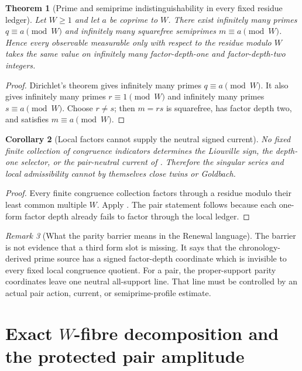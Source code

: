 \documentclass[11pt]{article}
\newtheorem{theorem}{Theorem}[section]
\newtheorem{corollary}[theorem]{Corollary}
\theoremstyle{definition}
\theoremstyle{remark}
\newtheorem{remark}[theorem]{Remark}
\begin{document}
\begin{theorem}[Prime and semiprime indistinguishability in every fixed residue ledger]
\label{thm:residue-parity-no-go}
Let $W\ge1$ and let $a$ be coprime to $W$.  There exist infinitely many primes
$q\equiv a\pmod W$ and infinitely many squarefree semiprimes
$m\equiv a\pmod W$.  Hence every observable measurable only with respect to
the residue modulo $W$ takes the same value on infinitely many factor-depth-one
and factor-depth-two integers.
\end{theorem}

\begin{proof}
Dirichlet's theorem gives infinitely many primes $q\equiv a\pmod W$.
It also gives infinitely many primes $r\equiv1\pmod W$ and infinitely many
primes $s\equiv a\pmod W$.  Choose $r\ne s$; then $m=rs$ is squarefree,
has factor depth two, and satisfies $m\equiv a\pmod W$.
\end{proof}

\begin{corollary}[Local factors cannot supply the neutral signed current]
\label{cor:local-no-sign}
No fixed finite collection of congruence indicators determines the Liouville
sign, the depth-one selector, or the pair-neutral current of
.  Therefore the singular series and local admissibility
cannot by themselves close twins or Goldbach.
\end{corollary}

\begin{proof}
Every finite congruence collection factors through a residue modulo their
least common multiple $W$.  Apply .  The pair
statement follows because each one-form factor depth already fails to factor
through the local ledger.
\end{proof}

\begin{remark}[What the parity barrier means in the Renewal language]
The barrier is not evidence that a third form slot is missing.  It says that
the chronology-derived prime source has a signed factor-depth coordinate which
is invisible to every fixed local congruence quotient.  For a pair, the
proper-support parity coordinates leave one neutral all-support line.  That
line must be controlled by an actual pair action, current, or semiprime-profile
estimate.
\end{remark}

\section{Exact \texorpdfstring{$W$}{W}-fibre decomposition and the protected pair amplitude}
\label{sec:W-fibres}
\end{document}
